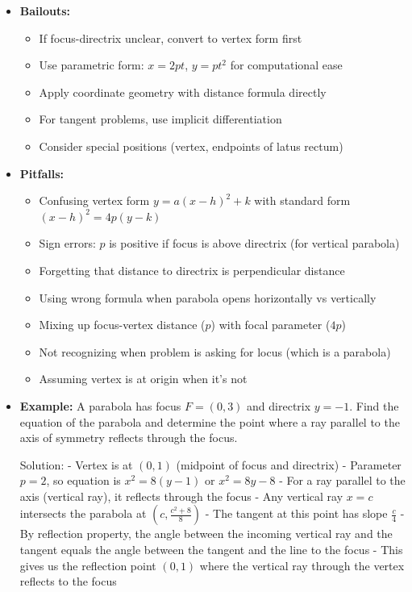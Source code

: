 \documentclass[12pt]{article}
\begin{document}
\begin{itemize}
    \item \textbf{Bailouts:} 
    \begin{itemize}
        \item If focus-directrix unclear, convert to vertex form first
        \item Use parametric form: $x = 2pt$, $y = pt^2$ for computational ease
        \item Apply coordinate geometry with distance formula directly
        \item For tangent problems, use implicit differentiation
        \item Consider special positions (vertex, endpoints of latus rectum)
    \end{itemize}
    
    \item \textbf{Pitfalls:} 
    \begin{itemize}
        \item Confusing vertex form $y = a(x-h)^2 + k$ with standard form $(x-h)^2 = 4p(y-k)$
        \item Sign errors: $p$ is positive if focus is above directrix (for vertical parabola)
        \item Forgetting that distance to directrix is perpendicular distance
        \item Using wrong formula when parabola opens horizontally vs vertically
        \item Mixing up focus-vertex distance ($p$) with focal parameter ($4p$)
        \item Not recognizing when problem is asking for locus (which is a parabola)
        \item Assuming vertex is at origin when it's not
    \end{itemize}
    
    \item \textbf{Example:} A parabola has focus $F = (0, 3)$ and directrix $y = -1$. Find the equation of the parabola and determine the point where a ray parallel to the axis of symmetry reflects through the focus.
    
    Solution: 
    - Vertex is at $(0, 1)$ (midpoint of focus and directrix)
    - Parameter $p = 2$, so equation is $x^2 = 8(y-1)$ or $x^2 = 8y - 8$
    - For a ray parallel to the axis (vertical ray), it reflects through the focus
    - Any vertical ray $x = c$ intersects the parabola at $(c, \frac{c^2+8}{8})$
    - The tangent at this point has slope $\frac{c}{4}$
    - By reflection property, the angle between the incoming vertical ray and the tangent equals the angle between the tangent and the line to the focus
    - This gives us the reflection point $(0, 1)$ where the vertical ray through the vertex reflects to the focus
\end{itemize}
\end{document}
